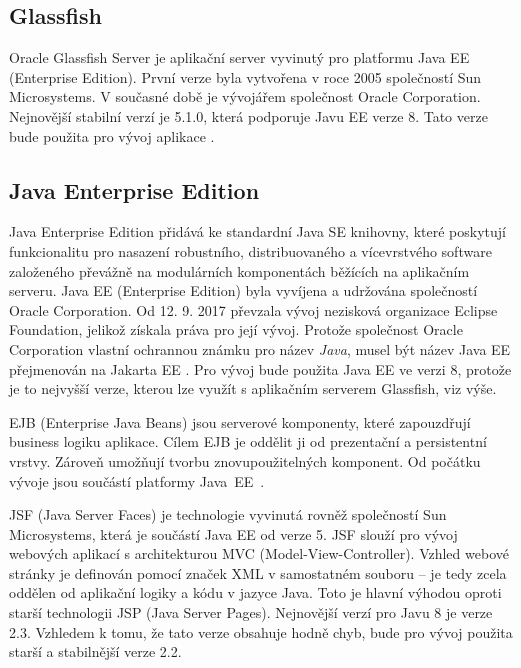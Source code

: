 
\subsection*{Glassfish}
Oracle Glassfish Server je aplikační server vyvinutý pro platformu Java EE (Enterprise Edition). První verze byla vytvořena v roce 2005 společností Sun Microsystems. V současné době je vývojářem společnost Oracle Corporation. Nejnovější stabilní verzí je 5.1.0, která podporuje Javu EE verze 8. Tato verze bude použita pro vývoj aplikace \cite{Technology_Glassfish}.

\subsection*{Java Enterprise Edition}

Java Enterprise Edition přidává ke standardní Java SE knihovny, které poskytují funkcionalitu pro nasazení robustního, distribuovaného a vícevrstvého software založeného převážně na modulárních komponentách běžících na aplikačním serveru. Java EE (Enterprise Edition) byla vyvíjena a udržována společností Oracle Corporation. Od 12. 9. 2017 převzala vývoj nezisková organizace Eclipse Foundation, jelikož získala práva pro její vývoj. Protože společnost Oracle Corporation vlastní ochrannou známku pro název \textit{Java}, musel být název Java EE přejmenován na Jakarta EE \cite{Technology_Java_EE}. Pro vývoj bude použita Java EE ve verzi 8, protože je to nejvyšší verze, kterou lze využít s aplikačním serverem Glassfish, viz výše.

EJB (Enterprise Java Beans) jsou serverové komponenty, které zapouzdřují business logiku aplikace. Cílem EJB je oddělit ji od prezentační a persistentní vrstvy. Zároveň umožňují tvorbu znovupoužitelných komponent. Od počátku vývoje jsou součástí platformy Java~EE~\cite{Technology_EJB}.

JSF (Java Server Faces) je technologie vyvinutá rovněž společností Sun Microsystems, která je součástí Java EE od verze 5. JSF slouží pro vývoj webových aplikací s architekturou MVC (Model-View-Controller). Vzhled webové stránky je definován pomocí značek XML v samostatném souboru -- je tedy zcela oddělen od aplikační logiky a kódu v jazyce Java. Toto je hlavní výhodou oproti starší technologii JSP (Java Server Pages). Nejnovější verzí pro Javu 8 je verze 2.3. Vzhledem k tomu, že tato verze obsahuje hodně chyb, bude pro vývoj použita starší a stabilnější verze 2.2.

